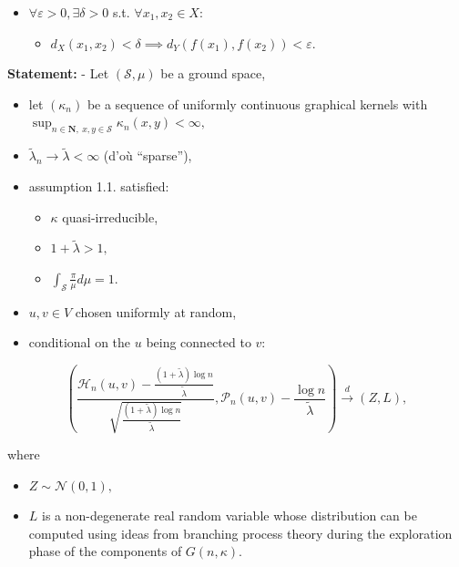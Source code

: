 \documentclass[
  letterpaper,
  DIV=11,
  numbers=noendperiod]{scrartcl}
\providecommand{\tightlist}{%
  \setlength{\itemsep}{0pt}\setlength{\parskip}{0pt}}\usepackage{longtable,booktabs,array}
\begin{document}
\begin{itemize}
\item
  \(\forall \varepsilon> 0, \exists \delta > 0\) s.t.
  \(\forall x_1, x_2 \in X\):

  \begin{itemize}
  \tightlist
  \item
    \(d_X(x_1, x_2) < \delta \implies d_Y(f(x_1), f(x_2)) < \varepsilon.\)
  \end{itemize}
\end{itemize}

\textbf{Statement:} - Let \((\mathcal{S}, \mu)\) be a ground space,

\begin{itemize}
\item
  let \((\kappa_n)\) be a sequence of uniformly continuous graphical
  kernels with
  \(\sup_{n \in \mathbf{N}, \: x, y \in \mathcal{S}} \kappa_n(x, y) < \infty,\)
\item
  \(\tilde{\lambda}_n \to \tilde{\lambda} < \infty\) (d'où ``sparse''),
\item
  assumption 1.1. satisfied:

  \begin{itemize}
  \item
    \(\kappa\) quasi-irreducible,
  \item
    \(1 + \tilde{\lambda} > 1,\)
  \item
    \(\int_{\mathcal{S}} \frac{\pi}{\mu} d\mu = 1.\)
  \end{itemize}
\item
  \(u, v \in V\) chosen uniformly at random,
\item
  conditional on the \(u\) being connected to \(v\):
\end{itemize}

\[
\left( \frac{\mathcal{H}_n(u, v) - \frac{(1 + \tilde{\lambda}) \log n}{\tilde{\lambda}}}{\sqrt{\frac{(1 + \tilde{\lambda}) \log n}{\tilde{\lambda}}}}, \mathcal{P}_n(u, v) - \frac{\log n}{\tilde{\lambda}}  \right) \xrightarrow{d} (Z, L),
\]

where

\begin{itemize}
\item
  \(Z \sim \mathcal{N}(0, 1),\)
\item
  \(L\) is a non-degenerate real random variable whose distribution can
  be computed using ideas from branching process theory during the
  exploration phase of the components of \(G(n, \kappa).\)
\end{itemize}
\end{document}
